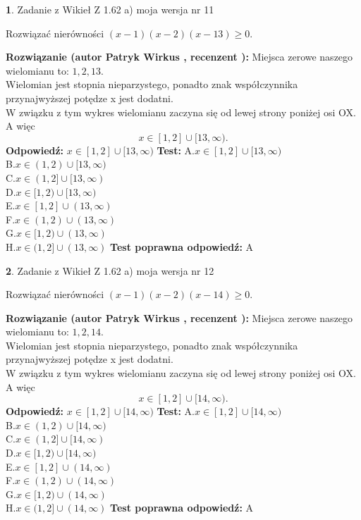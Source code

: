 \documentclass[12pt, a4paper]{article}
\theoremstyle{definition} %
\newtheorem{zad}{}
\newcommand{\zadStart}[1]{\begin{zad}#1\newline}
\newcommand{\zadStop}{\end{zad}}
\newcommand{\rozwStart}[2]{\noindent \textbf{Rozwiązanie (autor #1 , recenzent #2): }\newline}
\newcommand{\rozwStop}{\newline}
\newcommand{\odpStart}{\noindent \textbf{Odpowiedź:}\newline}
\newcommand{\odpStop}{\newline}
\newcommand{\testStart}{\noindent \textbf{Test:}\newline}
\newcommand{\testStop}{\newline}
\newcommand{\kluczStart}{\noindent \textbf{Test poprawna odpowiedź:}\newline}
\newcommand{\kluczStop}{\newline}
\begin{document}
\zadStart{Zadanie z Wikieł Z 1.62 a) moja wersja nr 11}

Rozwiązać nierówności $(x-1)(x-2)(x-13)\ge0$.
\zadStop
\rozwStart{Patryk Wirkus}{}
Miejsca zerowe naszego wielomianu to: $1, 2, 13$.\\
Wielomian jest stopnia nieparzystego, ponadto znak współczynnika przy\linebreak najwyższej potędze x jest dodatni.\\ W związku z tym wykres wielomianu zaczyna się od lewej strony poniżej osi OX. A więc $$x \in [1,2] \cup [13,\infty).$$
\rozwStop
\odpStart
$x \in [1,2] \cup [13,\infty)$
\odpStop
\testStart
A.$x \in [1,2] \cup [13,\infty)$\\
B.$x \in (1,2) \cup [13,\infty)$\\
C.$x \in (1,2] \cup [13,\infty)$\\
D.$x \in [1,2) \cup [13,\infty)$\\
E.$x \in [1,2] \cup (13,\infty)$\\
F.$x \in (1,2) \cup (13,\infty)$\\
G.$x \in [1,2) \cup (13,\infty)$\\
H.$x \in (1,2] \cup (13,\infty)$
\testStop
\kluczStart
A
\kluczStop



\zadStart{Zadanie z Wikieł Z 1.62 a) moja wersja nr 12}

Rozwiązać nierówności $(x-1)(x-2)(x-14)\ge0$.
\zadStop
\rozwStart{Patryk Wirkus}{}
Miejsca zerowe naszego wielomianu to: $1, 2, 14$.\\
Wielomian jest stopnia nieparzystego, ponadto znak współczynnika przy\linebreak najwyższej potędze x jest dodatni.\\ W związku z tym wykres wielomianu zaczyna się od lewej strony poniżej osi OX. A więc $$x \in [1,2] \cup [14,\infty).$$
\rozwStop
\odpStart
$x \in [1,2] \cup [14,\infty)$
\odpStop
\testStart
A.$x \in [1,2] \cup [14,\infty)$\\
B.$x \in (1,2) \cup [14,\infty)$\\
C.$x \in (1,2] \cup [14,\infty)$\\
D.$x \in [1,2) \cup [14,\infty)$\\
E.$x \in [1,2] \cup (14,\infty)$\\
F.$x \in (1,2) \cup (14,\infty)$\\
G.$x \in [1,2) \cup (14,\infty)$\\
H.$x \in (1,2] \cup (14,\infty)$
\testStop
\kluczStart
A
\kluczStop
\end{document}
